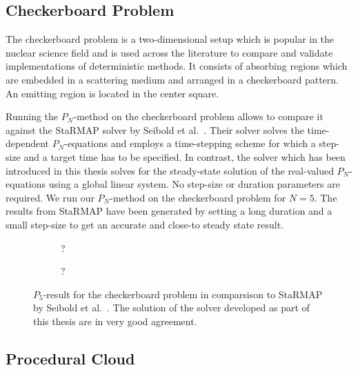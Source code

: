 \subsection{Checkerboard Problem}
\label{sec:pn_results_checkerboard}

The checkerboard problem is a two-dimensional setup which is popular in the nuclear science field and is used across the literature to compare and validate implementations of deterministic methods. It consists of absorbing regions which are embedded in a scattering medium and arranged in a checkerboard pattern. An emitting region is located in the center square.

Running the $P_N$-method on the checkerboard problem allows to compare it against the \textsf{StaRMAP} solver by Seibold et al.~\cite{Seibold14}. Their solver solves the time-dependent $P_N$-equations and employs a time-stepping scheme for which a step-size and a target time has to be specified. In contrast, the solver which has been introduced in this thesis solves for the steady-state solution of the real-valued $P_N$-equations using a global linear system. No step-size or duration parameters are required. We run our $P_N$-method on the checkerboard problem for $N=5$. The results from \textsf{StaRMAP} have been generated by setting a long duration and a small step-size to get an accurate and close-to steady state result.
\begin{figure}[h]
\centering
\begin{subfigure}{0.49\columnwidth}
\caption{?}
\end{subfigure}%
\hspace{0.01\columnwidth}
\begin{subfigure}{0.49\columnwidth}
\caption{?}
\end{subfigure}%
\caption{$P_5$-result for the checkerboard problem in comparsison to \textsf{StaRMAP} by Seibold et al.~\cite{Seibold14}. The solution of the solver developed as part of this thesis are in very good agreement.}
\label{fig:pn_results_checkerboard1}
\end{figure}

\subsection{Procedural Cloud}
\label{sec:pn_results_clouds}

